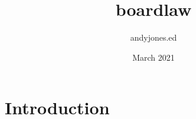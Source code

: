 \documentclass{article}
\title{boardlaw}
\author{andyjones.ed }
\date{March 2021}
\begin{document}
\maketitle

\section{Introduction}
\end{document}
